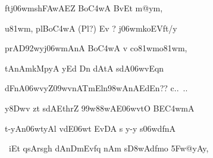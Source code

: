 {\dn ftj\306wmsh\3FAwAEZ Bo\3C4wA BvEt m@ym,\thinspace{\dandab} \dontdisplaylinenum }%


{\dn u\381wm, plBo\3C4wA {\rs (\re}Pl{\rs ?)\re} Ev {\rs ?\re} j\306wmkoEVft/y \veg\dontdisplaylinenum  }%


{\dn prAD\0\392wyj\306wmAnA\2 Bo\3C4wA v\4 co\381wmo\381wm,\thinspace{\dandab} \dontdisplaylinenum }%

{\dn {}tAnAmkMpyA yEd Dn\2 dAtA sdA\306wvEq\0n\? \danda\dontdisplaylinenum }%


{\dn dFnA\306wvyZ\?\309wvnATmEln\?\398wAnAEdEn{\rs ??\re} c{..\dn\ ..} \veg\dontdisplaylinenum }%


{\dn y\38Dw\?v zt\? sdAEt\0hrZ\2 \399w\388wAE\306wvtO BE\3C4wmA\thinspace{\dandab} \dontdisplaylinenum }%


{\dn t-yAn\306wtyAl\2 vdE\306wt EvDA\2 s y-y s\306wdf\0nA \veg\dontdisplaylinenum }%


\vers


{\dn 
\jump
\begin{center}
\ketdanda\ iEt qsArs\2g\5h\? dAnDm\0Evf\?q\2 nAm s\3D8wAdfmo \35Fw@yAy, \ketdanda
\end{center}
\dontdisplaylinenum\vers  }%
